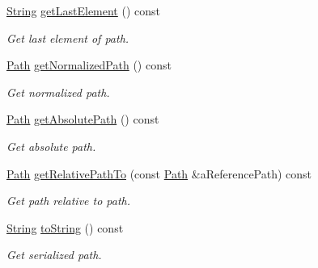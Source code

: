 \begin{DoxyCompactItemize}
\hyperlink{classlibrary_1_1core_1_1types_1_1_string}{String} \hyperlink{classlibrary_1_1core_1_1fs_1_1_path_a1beabf215fcc96dde591838556e00370}{get\+Last\+Element} () const
\begin{DoxyCompactList}\small\item\em Get last element of path. \end{DoxyCompactList}\item 
\hyperlink{classlibrary_1_1core_1_1fs_1_1_path}{Path} \hyperlink{classlibrary_1_1core_1_1fs_1_1_path_a920b1d062cb1274da811150afafba124}{get\+Normalized\+Path} () const
\begin{DoxyCompactList}\small\item\em Get normalized path. \end{DoxyCompactList}\item 
\hyperlink{classlibrary_1_1core_1_1fs_1_1_path}{Path} \hyperlink{classlibrary_1_1core_1_1fs_1_1_path_a09dc880115d1e0a9079ac8e106e82c92}{get\+Absolute\+Path} () const
\begin{DoxyCompactList}\small\item\em Get absolute path. \end{DoxyCompactList}\item 
\hyperlink{classlibrary_1_1core_1_1fs_1_1_path}{Path} \hyperlink{classlibrary_1_1core_1_1fs_1_1_path_a8f24340e887cfbfe675e96c0ba92321f}{get\+Relative\+Path\+To} (const \hyperlink{classlibrary_1_1core_1_1fs_1_1_path}{Path} \&a\+Reference\+Path) const
\begin{DoxyCompactList}\small\item\em Get path relative to path. \end{DoxyCompactList}\item 
\hyperlink{classlibrary_1_1core_1_1types_1_1_string}{String} \hyperlink{classlibrary_1_1core_1_1fs_1_1_path_a6f78df53d8e604dd9e1b43e23311724a}{to\+String} () const
\begin{DoxyCompactList}\small\item\em Get serialized path. \end{DoxyCompactList}\end{DoxyCompactItemize}
